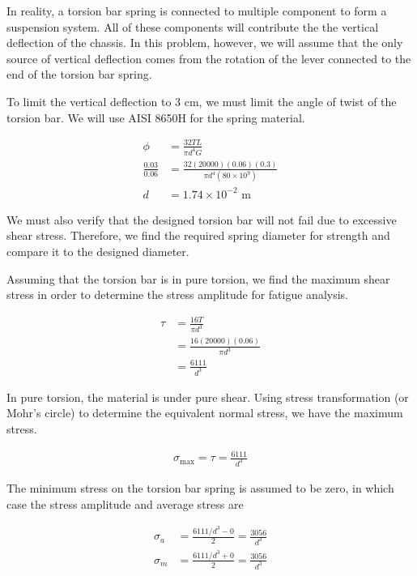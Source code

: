 \documentclass[a4paper,openany,nobib]{tufte-book}
\begin{document}
{{In reality, a torsion bar spring is connected to multiple component to
form a suspension system. All of these components will contribute the
the vertical deflection of the chassis. In this problem, however, we
will assume that the only source of vertical deflection comes from the
rotation of the lever connected to the end of the torsion bar spring.

To limit the vertical deflection to 3 cm, we must limit the angle of
twist of the torsion bar. We will use AISI 8650H for the spring
material.

$$\begin{aligned}
    \phi &= \frac{32TL}{\pi d^4 G} \\
    \frac{0.03}{0.06}  &= \frac{32(20000)(0.06)(0.3)}{\pi d^4 (80 \times 10^9)} \\
    d &= 1.74 \times 10^{-2} \text{ m}
  \end{aligned}$$

We must also verify that the designed torsion bar will not fail due to
excessive shear stress. Therefore, we find the required spring diameter
for strength and compare it to the designed diameter.

Assuming that the torsion bar is in pure torsion, we find the maximum
shear stress in order to determine the stress amplitude for fatigue
analysis.

$$\begin{aligned}
    \tau  &= \frac{16T}{\pi d^3} \\
          &= \frac{16(20000)(0.06)}{\pi d^3} \\
          &= \frac{6111}{d^3}
  \end{aligned}$$

In pure torsion, the material is under pure shear. Using stress
transformation (or Mohr's circle) to determine the equivalent normal
stress, we have the maximum stress.

$$\begin{gathered}
    \sigma_{\max} = \tau = \frac{6111}{d^3}
  \end{gathered}$$

The minimum stress on the torsion bar spring is assumed to be zero, in
which case the stress amplitude and average stress are

$$\begin{aligned}
    \sigma_a &= \frac{6111/d^3 - 0}{2} = \frac{3056}{d^3} \\
    \sigma_m &= \frac{6111/d^3 + 0}{2} = \frac{3056}{d^3}
  \end{aligned}$$

}}
\end{document}
